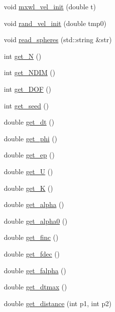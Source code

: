 \begin{DoxyCompactItemize}
\item 
void \mbox{\hyperlink{classpacking_ad096a61ae3cd07d3a85f0c865ec0af70}{mxwl\+\_\+vel\+\_\+init}} (double t)
\item 
void \mbox{\hyperlink{classpacking_afa5fb6a5af7e185656c85f10534572a9}{rand\+\_\+vel\+\_\+init}} (double tmp0)
\item 
void \mbox{\hyperlink{classpacking_a15619b62e055ec5e1897fb8d40b194b2}{read\+\_\+spheres}} (std\+::string \&str)
\item 
int \mbox{\hyperlink{classpacking_addc33dab6e59ce3a959b1987ac0a4fce}{get\+\_\+N}} ()
\item 
int \mbox{\hyperlink{classpacking_a09b1231993da19d68581f630365d0c3a}{get\+\_\+\+N\+D\+IM}} ()
\item 
int \mbox{\hyperlink{classpacking_a0b60c2368d6b16389edfdb81bd0f45b7}{get\+\_\+\+D\+OF}} ()
\item 
int \mbox{\hyperlink{classpacking_ac99ab03b903298da3ac29dde9fdd4ad1}{get\+\_\+seed}} ()
\item 
double \mbox{\hyperlink{classpacking_a778812fa17eb4daa96adc03f1ce5128c}{get\+\_\+dt}} ()
\item 
double \mbox{\hyperlink{classpacking_a08f9bf70b057ad530e1499c15fdb34ff}{get\+\_\+phi}} ()
\item 
double \mbox{\hyperlink{classpacking_abe5e5105ed2b581e64f0ba5608e2ccb6}{get\+\_\+ep}} ()
\item 
double \mbox{\hyperlink{classpacking_ac2544dd44e1dd8bfb08315f94d543bc3}{get\+\_\+U}} ()
\item 
double \mbox{\hyperlink{classpacking_ab484a3d36c45db72614267af5a203f76}{get\+\_\+K}} ()
\item 
double \mbox{\hyperlink{classpacking_a366b4efa1f1fecf098df6bb9af09e739}{get\+\_\+alpha}} ()
\item 
double \mbox{\hyperlink{classpacking_a357aeeeac709d7926cbbaa9312cf3649}{get\+\_\+alpha0}} ()
\item 
double \mbox{\hyperlink{classpacking_a58b555de4a9902399b3ab82dabfefd12}{get\+\_\+finc}} ()
\item 
double \mbox{\hyperlink{classpacking_a2b4e47ab0671d9ee9892495df465be17}{get\+\_\+fdec}} ()
\item 
double \mbox{\hyperlink{classpacking_a0c8cad7afd9da1c30856b1201be15535}{get\+\_\+falpha}} ()
\item 
double \mbox{\hyperlink{classpacking_a36de243c3a970bbf0840a17bf9758e61}{get\+\_\+dtmax}} ()
\item 
double \mbox{\hyperlink{classpacking_acf25ed42e0fdfc8334d9c6468e5c34e1}{get\+\_\+distance}} (int p1, int p2)

\end{DoxyCompactItemize}
